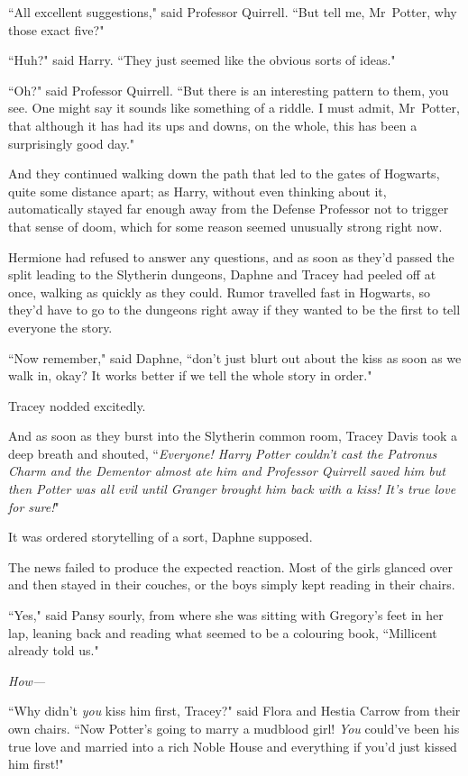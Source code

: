 ``All excellent suggestions," said Professor Quirrell. ``But tell me, Mr~Potter, why those exact five?"

``Huh?" said Harry. ``They just seemed like the obvious sorts of ideas."

``Oh?" said Professor Quirrell. ``But there is an interesting pattern to them, you see. One might say it sounds like something of a riddle. I must admit, Mr~Potter, that although it has had its ups and downs, on the whole, this has been a surprisingly good day."

And they continued walking down the path that led to the gates of Hogwarts, quite some distance apart; as Harry, without even thinking about it, automatically stayed far enough away from the Defense Professor not to trigger that sense of doom, which for some reason seemed unusually strong right now.


Hermione had refused to answer any questions, and as soon as they'd passed the split leading to the Slytherin dungeons, Daphne and Tracey had peeled off at once, walking as quickly as they could. Rumor travelled fast in Hogwarts, so they'd have to go to the dungeons right away if they wanted to be the first to tell everyone the story.

``Now remember," said Daphne, ``don't just blurt out about the kiss as soon as we walk in, okay? It works better if we tell the whole story in order."

Tracey nodded excitedly.

And as soon as they burst into the Slytherin common room, Tracey Davis took a deep breath and shouted, ``\emph{Everyone! Harry Potter couldn't cast the Patronus Charm and the Dementor almost ate him and Professor Quirrell saved him but then Potter was all evil until Granger brought him back with a kiss! It's true love for sure!}"

It was ordered storytelling of a sort, Daphne supposed.

The news failed to produce the expected reaction. Most of the girls glanced over and then stayed in their couches, or the boys simply kept reading in their chairs.

``Yes," said Pansy sourly, from where she was sitting with Gregory's feet in her lap, leaning back and reading what seemed to be a colouring book, ``Millicent already told us."

\emph{How—}

``Why didn't \emph{you} kiss him first, Tracey?" said Flora and Hestia Carrow from their own chairs. ``Now Potter's going to marry a mudblood girl! \emph{You} could've been his true love and married into a rich Noble House and everything if you'd just kissed him first!"

